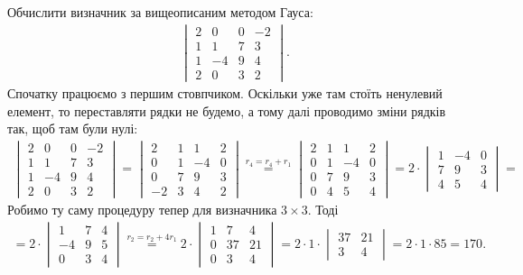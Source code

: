 \documentclass{math_library}
\begin{document}
\begin{example}
Обчислити визначник за вищеописаним методом Гауса:
\begin{align*}
\begin{vmatrix}
2 & 0 & 0 & -2 \\
1 & 1 & 7 & 3 \\
1 & -4 & 9 & 4 \\
2 & 0 & 3 & 2
\end{vmatrix}.
\end{align*}
Спочатку працюємо з першим стовпчиком. Оскільки уже там стоїть ненулевий елемент, то переставляти рядки не будемо, а тому далі проводимо зміни рядків так, щоб там були нулі:
\begin{align*}
\begin{vmatrix}
2 & 0 & 0 & -2 \\
1 & 1 & 7 & 3 \\
1 & -4 & 9 & 4 \\
2 & 0 & 3 & 2
\end{vmatrix} = \begin{vmatrix}
2 & 1 & 1 & 2 \\
0 & 1 & -4 & 0 \\
0 & 7 & 9 & 3 \\
-2 & 3 & 4 & 2
\end{vmatrix} \overset{r_4 = r_4 + r_1}{=} \begin{vmatrix}
2 & 1 & 1 & 2 \\
0 & 1 & -4 & 0 \\
0 & 7 & 9 & 3 \\
0 & 4 & 5 & 4
\end{vmatrix} = 2 \cdot \begin{vmatrix}
1 & -4 & 0 \\
7 & 9 & 3 \\
4 & 5 & 4
\end{vmatrix} \boxed{=}
\end{align*}
Робимо ту саму процедуру тепер для визначника $3 \times 3$. Тоді
\begin{align*}
\boxed{=} 2 \cdot \begin{vmatrix}
1 & 7 & 4 \\
-4 & 9 & 5 \\
0 & 3 & 4
\end{vmatrix} \overset{r_2 = r_2 + 4r_1}{=} 2 \cdot \begin{vmatrix}
1 & 7 & 4 \\
0 & 37 & 21 \\
0 & 3 & 4
\end{vmatrix} = 2 \cdot 1 \cdot \begin{vmatrix}
37 & 21 \\
3 & 4
\end{vmatrix} = 2 \cdot 1 \cdot 85 = 170.
\end{align*}
\end{example}
\end{document}
